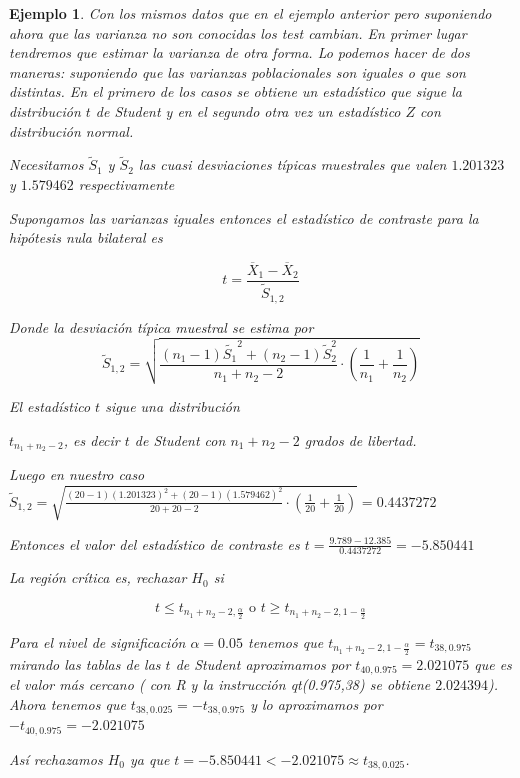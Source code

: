 \documentclass[12pt]{report}
\newtheorem{example}[definition]{Ejemplo}
\begin{document}
\begin{example}

Con los mismos datos que en el ejemplo anterior pero suponiendo ahora que las varianza no son conocidas los test cambian. En primer lugar tendremos que estimar la varianza de otra forma. Lo podemos hacer de dos maneras: suponiendo que las varianzas poblacionales son iguales o que son distintas.
En el primero de los casos se obtiene un estadístico que sigue la distribución $t$ de Student y en el segundo otra vez un estadístico $Z$ con distribución normal.

Necesitamos $\tilde{S}_1$ y $\tilde{S}_2$ las cuasi desviaciones típicas muestrales que valen $1.201323$ y $1.579462$ respectivamente

Supongamos las varianzas iguales entonces el estadístico de contraste para la hipótesis nula bilateral es



$$t=\frac{\overline{X}_1 -\overline{X}_2}{
\tilde{S}_{1,2}}$$


Donde la desviación típica muestral se estima por $$\tilde{S}_{1,2}=\sqrt{
\frac{(n_1-1)\tilde{S_1}^2 +(n_2 -1)\tilde{S}_2^2}{n_1 +n_2
-2}\cdot\left(\frac{1}{n_1}+\frac{1}{n_2}\right)}$$ 


El estadístico $t$ sigue una distribución

$t_{n_1 +n_2
-2}$, es decir $t$ de Student con $n_1 +n_2 -2$ grados de libertad.

Luego en nuestro caso $\tilde{S}_{1,2}=\sqrt{\frac{(20
-1)( 1.201323)^2 +(20 -1)(1.579462)^2}{20 + 20 
-2}\cdot\left(\frac{1}{20}+\frac{1}{20}\right)}= 0.4437272$



Entonces el valor del estadístico de contraste es $t= \frac{9.789-12.385}{0.4437272}=-5.850441$


La región crítica es, rechazar $H_0$ si 




$$t\leq t_{n_1+n_2-2,\frac{\alpha}{2}}\mbox{ o } t \geq
t_{n_1+n_2-2,1-\frac{\alpha}{2}}$$


Para el nivel de significación $\alpha=0.05$ tenemos que $t_{n_1+n_2-2,1-\frac{\alpha}{2}}=t_{38,0.975}$ mirando las tablas de las $t$ de Student aproximamos por $t_{40,0.975}= 2.021075$ que es el valor más cercano ( con R y la instrucción qt(0.975,38) se obtiene  $2.024394$). Ahora tenemos que $t_{38,0.025}=-t_{38,0.975}$ y lo aproximamos por $-t_{40,0.975}= -2.021075$

Así rechazamos $H_0$ ya que $t=-5.850441< -2.021075\approx t_{38,0.025}$.



\end{example}
\end{document}
